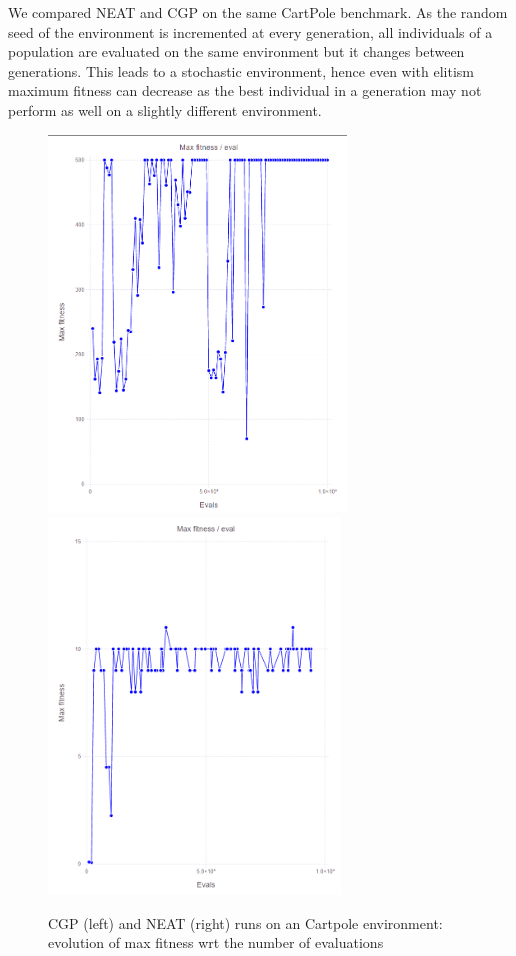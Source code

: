 We compared NEAT and CGP on the same CartPole benchmark. As the random seed of the environment is incremented at every generation, all individuals of a population are evaluated on the same environment but it changes between generations. This leads to a stochastic environment, hence even with elitism maximum fitness can decrease as the best individual in a generation may not perform as well on a slightly different environment. 

\begin{figure}[H]
\centering
\captionsetup{justification=centering,margin=2cm}
\includegraphics[height=10cm]{images/cgp_cartpole.PNG}
\includegraphics[height=10cm]{images/neat_cartpole.PNG}
\caption{CGP (left) and NEAT (right) runs on an Cartpole environment: evolution of max fitness wrt the number of evaluations}
\end{figure}

